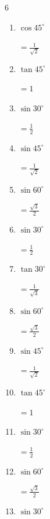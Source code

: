 \begin{multicols}{6}
\begin{enumerate}
        $\displaystyle =\frac{1}{\sqrt{3}}$

  \item $\displaystyle \cos{45^\circ}$

        $\displaystyle =\frac{1}{\sqrt{2}}$

  \item $\displaystyle \tan{45^\circ}$

        $\displaystyle =1$

  \item $\displaystyle \sin{30^\circ}$

        $\displaystyle =\frac{1}{2}$

  \item $\displaystyle \sin{45^\circ}$

        $\displaystyle =\frac{1}{\sqrt{2}}$

  \item $\displaystyle \sin{60^\circ}$

        $\displaystyle =\frac{\sqrt{3}}{2}$

  \item $\displaystyle \sin{30^\circ}$

        $\displaystyle =\frac{1}{2}$

  \item $\displaystyle \tan{30^\circ}$

        $\displaystyle =\frac{1}{\sqrt{3}}$

  \item $\displaystyle \sin{60^\circ}$

        $\displaystyle =\frac{\sqrt{3}}{2}$

  \item $\displaystyle \sin{45^\circ}$

        $\displaystyle =\frac{1}{\sqrt{2}}$

  \item $\displaystyle \tan{45^\circ}$

        $\displaystyle =1$

  \item $\displaystyle \sin{30^\circ}$

        $\displaystyle =\frac{1}{2}$

  \item $\displaystyle \sin{60^\circ}$

        $\displaystyle =\frac{\sqrt{3}}{2}$

\columnbreak %

  \item $\displaystyle \sin{30^\circ}$


\end{enumerate}
\end{multicols}
